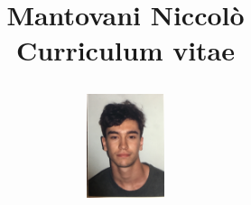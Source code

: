 \documentclass[a4paper,11pt]{article}
\begin{document}
	\title{
	
		\hspace{5mm}
		\begin{minipage}[b]{0.4\textwidth}
			Mantovani Niccolò \\
			\large Curriculum vitae
		\end{minipage}
		\hfill
		\hfill
		\begin{minipage}[b]{0.4\textwidth}
			\includegraphics[width=0.9in]{src/img/foto_formato_tessera.jpg}     
		\end{minipage}

		\vspace{5mm}
		}
	\date{}
	\maketitle
	
	
	\vspace{1mm}
	
	\vspace{1mm}
	
	\newpage
	
	\vspace{1mm}
	
	\vspace{1mm}
	
\end{document}
